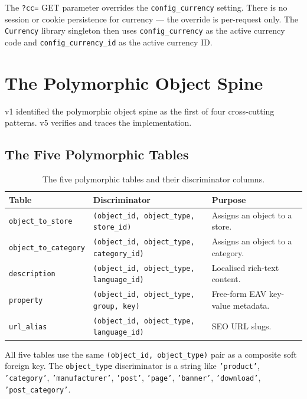 \documentclass[11pt,a4paper]{article}
\begin{document}
The \texttt{?cc=} GET parameter overrides the \texttt{config\_currency}
setting. There is no session or cookie persistence for currency --- the
override is per-request only. The \texttt{Currency} library singleton
then uses \texttt{config\_currency} as the active currency code and
\texttt{config\_currency\_id} as the active currency ID.

\section{The Polymorphic Object Spine}\label{sec:object-spine}

v1 identified the polymorphic object spine as the first of four
cross-cutting patterns. v5 verifies and traces the implementation.

\subsection{The Five Polymorphic Tables}

\begin{table}[htbp]
\centering
\caption{The five polymorphic tables and their discriminator columns.}\label{tab:polymorphic-tables}
\footnotesize\sloppy
\begin{tabularx}{\columnwidth}{>{\raggedright\arraybackslash}p{3.0cm}lX}
\toprule
\textbf{Table} & \textbf{Discriminator} & \textbf{Purpose} \\
\midrule
\texttt{object\_to\_store}   & \texttt{(object\_id, object\_type, store\_id)} & Assigns an object to a store. \\
\texttt{object\_to\_category} & \texttt{(object\_id, object\_type, category\_id)} & Assigns an object to a category. \\
\texttt{description}         & \texttt{(object\_id, object\_type, language\_id)} & Localised rich-text content. \\
\texttt{property}            & \texttt{(object\_id, object\_type, group, key)} & Free-form EAV key-value metadata. \\
\texttt{url\_alias}          & \texttt{(object\_id, object\_type, language\_id)} & SEO URL slugs. \\
\bottomrule
\end{tabularx}
\end{table}

All five tables use the same \texttt{(object\_id, object\_type)} pair as
a composite soft foreign key. The \texttt{object\_type} discriminator
is a string like \texttt{'product'}, \texttt{'category'},
\texttt{'manufacturer'}, \texttt{'post'}, \texttt{'page'},
\texttt{'banner'}, \texttt{'download'},
\texttt{'post\_category'}.
\end{document}
